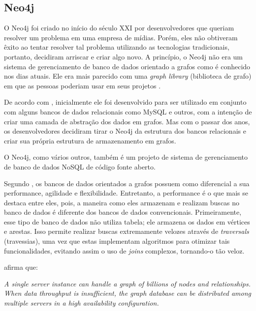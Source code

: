 \subsection{Neo4j}

\par O Neo4j foi criado no início do século XXI por desenvolvedores que queriam resolver um problema em uma empresa de mídias. Porém, eles não obtiveram êxito ao tentar resolver tal problema utilizando as tecnologias tradicionais, portanto, decidiram arriscar e criar algo novo. A princípio, o Neo4j não era um sistema de gerenciamento de banco de dados orientado a grafos como é conhecido nos dias atuais. Ele era mais parecido com uma \textit{graph library} (biblioteca de grafo) em que as pessoas poderiam usar em seus projetos \cite{bruggen_learning_neo4j}.

\par De acordo com , inicialmente ele foi desenvolvido para ser utilizado em conjunto com alguns bancos de dados relacionais como MySQL e outros, com a intenção de criar uma camada de abstração dos dados em grafos. Mas com o passar dos anos, os desenvolvedores decidiram tirar o Neo4j da estrutura dos bancos relacionais e criar sua própria estrutura de armazenamento em grafos.

\par O Neo4j, como vários outros, também é um projeto de sistema de gerenciamento de banco de dados NoSQL de código fonte aberto.

\par Segundo , os bancos de dados orientados a grafos possuem como diferencial a sua performance, agilidade e flexibilidade. Entretanto, a performance é o que mais se destaca entre eles, pois, a maneira como eles armazenam e realizam buscas no banco de dados é diferente dos bancos de dados convencionais. Primeiramente, esse tipo de banco de dados não utiliza tabela; ele armazena os dados em vértices e arestas. Isso permite realizar buscas extremamente velozes através de \textit{traversals} (travessias), uma vez que estas implementam algoritmos para otimizar tais funcionalidades, evitando assim o uso de \textit{joins} complexos, tornando-o tão veloz.

\par {} afirma que:

\begin{citacao}
	\textit{A single server instance can handle a graph of billions of nodes and relationships. When data throughput is insufficient, the graph database can be distributed among multiple servers in a high availability configuration.}\footnotemark[11]
\end{citacao}

